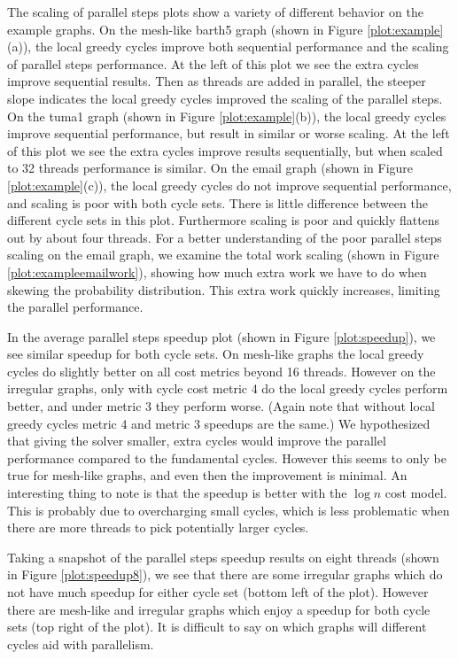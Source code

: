 \documentclass{sig-alternate}
\begin{document}
The scaling of parallel steps plots show
a variety of different behavior on the example graphs.
On the mesh-like barth5 graph
(shown in Figure \ref{plot:example}(a)),
the local greedy cycles improve both sequential
performance and the scaling of parallel steps performance.
At the left of this plot we see the extra cycles improve sequential results.
Then as threads are added in parallel, the steeper
slope indicates the local greedy cycles improved
the scaling of the parallel steps.
On the tuma1 graph
(shown in Figure \ref{plot:example}(b)),
the local greedy cycles improve sequential performance,
but result in similar or worse scaling.
At the left of this plot we see the extra cycles improve results
sequentially, but when scaled to 32 threads performance is similar.
On the email graph
(shown in Figure \ref{plot:example}(c)),
the local greedy cycles do not improve
sequential performance, and scaling is poor with both cycle sets.
There is little difference between the different cycle sets in this
plot. Furthermore scaling is poor and quickly flattens out by about
four threads.
For a better understanding of the poor parallel steps
scaling on the email graph, we examine the total work scaling
(shown in Figure \ref{plot:exampleemailwork}), showing how much extra
work we have to do when skewing the probability distribution.
This extra work quickly increases, limiting the parallel performance.

In the average parallel steps
speedup plot (shown in Figure \ref{plot:speedup}), we see
similar speedup for both cycle sets. On mesh-like graphs the local greedy
cycles do slightly better on all cost metrics beyond 16 threads. However
on the irregular graphs, only with cycle cost metric 4 do the local greedy
cycles perform better, and under metric 3 they perform worse. (Again note
that without local greedy cycles metric 4 and metric 3 speedups are the same.)
We hypothesized that giving the solver smaller, extra cycles
would improve the parallel
performance compared to the fundamental cycles.
However this seems to only be true for mesh-like graphs,
and even then the improvement is minimal.
An interesting thing to note is that the speedup
is better with the $\log{n}$ cost model. This is probably due to overcharging
small cycles, which is less problematic when there
are more threads to pick potentially
larger cycles.

Taking a snapshot of the parallel steps speedup results on eight threads
(shown in Figure \ref{plot:speedup8}),
we see that there are some irregular
graphs which do not have much speedup for either cycle set
(bottom left of the plot).
However there are mesh-like and irregular graphs
which enjoy a speedup for both cycle sets (top right
of the plot).
It is difficult to say on which graphs will different
cycles aid with parallelism.
\end{document}
